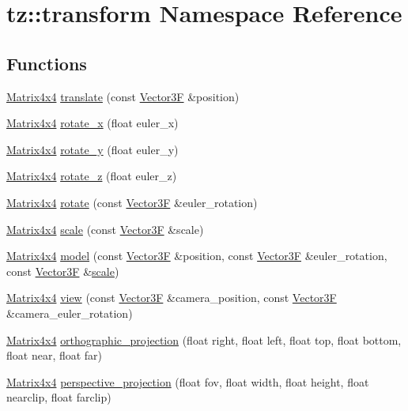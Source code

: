 \hypertarget{namespacetz_1_1transform}{}\section{tz\+:\+:transform Namespace Reference}
\label{namespacetz_1_1transform}
\subsection*{Functions}
\begin{DoxyCompactItemize}
\item 
\mbox{\hyperlink{class_matrix4x4}{Matrix4x4}} \mbox{\hyperlink{namespacetz_1_1transform_aaf7c616e2645fda6e6e38899bfd52119}{translate}} (const \mbox{\hyperlink{class_vector3}{Vector3F}} \&position)
\item 
\mbox{\hyperlink{class_matrix4x4}{Matrix4x4}} \mbox{\hyperlink{namespacetz_1_1transform_a41841500a4f61978a446b7a92a982c61}{rotate\+\_\+x}} (float euler\+\_\+x)
\item 
\mbox{\hyperlink{class_matrix4x4}{Matrix4x4}} \mbox{\hyperlink{namespacetz_1_1transform_ad4f8e1471ddc14c62c3247f4335780a5}{rotate\+\_\+y}} (float euler\+\_\+y)
\item 
\mbox{\hyperlink{class_matrix4x4}{Matrix4x4}} \mbox{\hyperlink{namespacetz_1_1transform_a1fc9b0958f30aba9c97d55bc25fde583}{rotate\+\_\+z}} (float euler\+\_\+z)
\item 
\mbox{\hyperlink{class_matrix4x4}{Matrix4x4}} \mbox{\hyperlink{namespacetz_1_1transform_aeeb88eb1d2cd9565afb0cca2ab011f89}{rotate}} (const \mbox{\hyperlink{class_vector3}{Vector3F}} \&euler\+\_\+rotation)
\item 
\mbox{\hyperlink{class_matrix4x4}{Matrix4x4}} \mbox{\hyperlink{namespacetz_1_1transform_a662bede6ecd13fd3555d612a06c350cf}{scale}} (const \mbox{\hyperlink{class_vector3}{Vector3F}} \&scale)
\item 
\mbox{\hyperlink{class_matrix4x4}{Matrix4x4}} \mbox{\hyperlink{namespacetz_1_1transform_a0cf7e4695205f96b42fcb9fd316193d7}{model}} (const \mbox{\hyperlink{class_vector3}{Vector3F}} \&position, const \mbox{\hyperlink{class_vector3}{Vector3F}} \&euler\+\_\+rotation, const \mbox{\hyperlink{class_vector3}{Vector3F}} \&\mbox{\hyperlink{namespacetz_1_1transform_a662bede6ecd13fd3555d612a06c350cf}{scale}})
\item 
\mbox{\hyperlink{class_matrix4x4}{Matrix4x4}} \mbox{\hyperlink{namespacetz_1_1transform_af50903633804f4488c75cfc54d5100dc}{view}} (const \mbox{\hyperlink{class_vector3}{Vector3F}} \&camera\+\_\+position, const \mbox{\hyperlink{class_vector3}{Vector3F}} \&camera\+\_\+euler\+\_\+rotation)
\item 
\mbox{\hyperlink{class_matrix4x4}{Matrix4x4}} \mbox{\hyperlink{namespacetz_1_1transform_a8a5b3be2af4fcc2bb4c92a42bdd563ae}{orthographic\+\_\+projection}} (float right, float left, float top, float bottom, float near, float far)
\item 
\mbox{\hyperlink{class_matrix4x4}{Matrix4x4}} \mbox{\hyperlink{namespacetz_1_1transform_aadc949f1b24a655a504e9a7ead18e2b2}{perspective\+\_\+projection}} (float fov, float width, float height, float nearclip, float farclip)
\end{DoxyCompactItemize}



